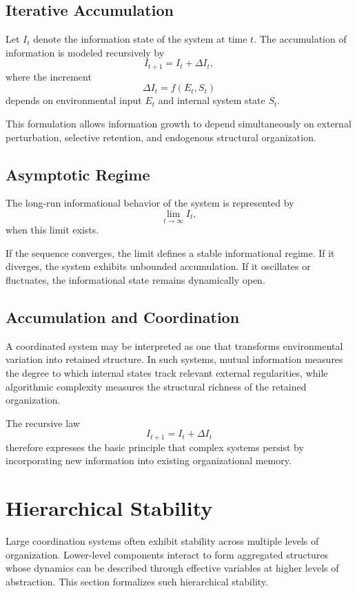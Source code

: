 \documentclass[12pt]{article}
\begin{document}
\subsection{Iterative Accumulation}

Let $I_t$ denote the information state of the system at time $t$. The accumulation of information is modeled recursively by
\[
I_{t+1} = I_t + \Delta I_t ,
\]
where the increment
\[
\Delta I_t = f(E_t , S_t)
\]
depends on environmental input $E_t$ and internal system state $S_t$.

This formulation allows information growth to depend simultaneously on external perturbation, selective retention, and endogenous structural organization.

\subsection{Asymptotic Regime}

The long-run informational behavior of the system is represented by
\[
\lim_{t \to \infty} I_t ,
\]
when this limit exists.

If the sequence converges, the limit defines a stable informational regime. If it diverges, the system exhibits unbounded accumulation. If it oscillates or fluctuates, the informational state remains dynamically open.

\subsection{Accumulation and Coordination}

A coordinated system may be interpreted as one that transforms environmental variation into retained structure. In such systems, mutual information measures the degree to which internal states track relevant external regularities, while algorithmic complexity measures the structural richness of the retained organization.

The recursive law
\[
I_{t+1} = I_t + \Delta I_t
\]
therefore expresses the basic principle that complex systems persist by incorporating new information into existing organizational memory.

\section{Hierarchical Stability}

Large coordination systems often exhibit stability across multiple levels of organization. Lower-level components interact to form aggregated structures whose dynamics can be described through effective variables at higher levels of abstraction. This section formalizes such hierarchical stability.
\end{document}
